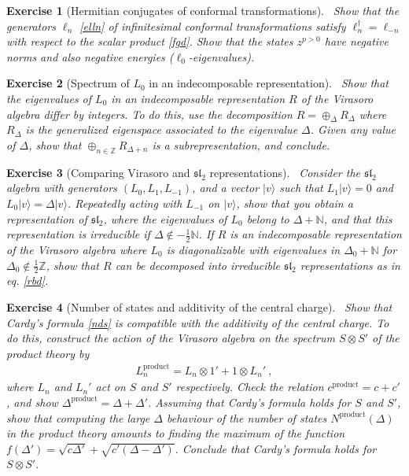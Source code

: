 \documentclass[12pt, a4paper, notitlepage, twoside]{report}
\numberwithin{equation}{section}
\theoremstyle{break}
\newtheorem{exo}{Exercise}[chapter]
\begin{document}
\begin{exo}[Hermitian conjugates of conformal transformations]
 ~\label{exolnd}
Show that the generators $\ell_n$ \eqref{elln} of infinitesimal conformal transformations satisfy $\ell_n^\dagger =\ell_{-n}$ with respect to the scalar product \eqref{fgd}.
Show that the states $z^{p>0}$ have negative norms and also negative energies ($\ell_0$-eigenvalues). 
\end{exo}

\begin{exo}[Spectrum of $L_0$ in an indecomposable representation]
 ~\label{exodiffint}
Show that the eigenvalues of $L_0$ in an indecomposable representation $R$ of the Virasoro algebra differ by integers.
To do this, use the decomposition $R=\oplus_\Delta R_\Delta$ where $R_\Delta$ is the generalized eigenspace associated to the eigenvalue $\Delta$.
Given any value of $\Delta$, show that  $\oplus_{n\in{\mathbb{Z}}} R_{\Delta+n}$ is a subrepresentation, and conclude. 
\end{exo}

\begin{exo}[Comparing Virasoro and $\mathfrak{sl}_2$ representations]
 ~\label{exodis}
Consider the $\mathfrak{sl}_2$ algebra with generators $(L_0,L_1,L_{-1})$, and a vector $|v\rangle$ such that $L_1|v\rangle = 0 $ and $L_0|v\rangle = \Delta |v\rangle$.
Repeatedly acting with $L_{-1}$ on $|v\rangle$, show that you obtain a representation of $\mathfrak{sl}_2$, where the eigenvalues of $L_0$ belong to $\Delta+{\mathbb{N}}$, and that this representation is irreducible if $\Delta\notin -\frac12 \mathbb{N}$.
If $R$ is an indecomposable representation of the Virasoro algebra where $L_0$ is diagonalizable with eigenvalues in $\Delta_0+\mathbb{N}$ for $\Delta_0\notin\frac12 \mathbb{Z}$, show that $R$ can be decomposed into irreducible $\mathfrak{sl}_2$ representations as in eq. \eqref{rbd}.
\end{exo}


\begin{exo}[Number of states and additivity of the central charge]
 ~\label{exoacf} 
Show that Cardy's formula \eqref{nds} is compatible with the additivity of the central charge.
To do this, construct the action of the Virasoro algebra on the spectrum $S\otimes S'$ of the product theory by 
\begin{align}
 L_n^\text{product} = L_n\otimes 1' + 1\otimes L_n'\ ,
\end{align}
where $L_n$ and $L_n'$ act on $S$ and $S'$ respectively.
Check the relation $c^\text{product} = c+c'$, and show $\Delta^\text{product} = \Delta+\Delta'$.
Assuming that Cardy's formula holds for $S$ and $S'$, show that computing the large $\Delta$ behaviour of the number of states $N^\text{product}(\Delta)$ in the product theory amounts to finding the maximum of the function $f(\Delta') = \sqrt{c\Delta'} +\sqrt{c'(\Delta-\Delta')}$.
Conclude that Cardy's formula holds for $S\otimes S'$.
\end{exo}
\end{document}
